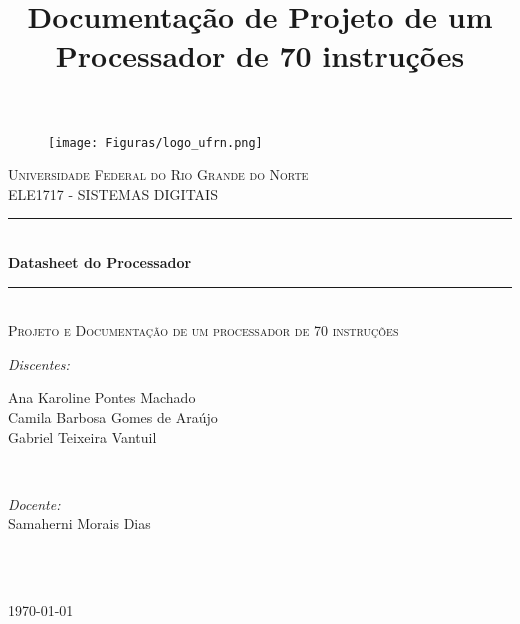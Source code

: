 \documentclass[12pt]{article}
\begin{document}
\title{Documentação de Projeto de um Processador de 70 instruções}

\begin{titlepage}
 
\newcommand{\HRule}{\rule{\linewidth}{0.5mm}} %

\center %

\begin{figure}[!htb]
\centering
\texttt{[image: Figuras/logo\_ufrn.png]}
\end{figure}

\textsc{\LARGE Universidade Federal do Rio Grande do Norte}\\[2cm] %
\textsc{\Large ELE1717 - SISTEMAS DIGITAIS}\\[1cm] %

\HRule \\[0.6cm]
{ \huge \bfseries Datasheet do Processador}\\[0.4cm] %
\HRule \\[1cm]

\textsc{\large Projeto e Documentação de um processador de 70 instruções}\\[3.5cm] %
 

\begin{minipage}{0.4\textwidth}
\begin{flushleft} \large
\emph{Discentes:}\\
\begin{tabbing}
Ana Karoline Pontes Machado\\
Camila Barbosa Gomes de Araújo \\
Gabriel Teixeira Vantuil\\
\end{tabbing}
\end{flushleft}
\end{minipage}
~
\begin{minipage}{0.4\textwidth}
\begin{flushright} \large
\emph{Docente:}\\
Samaherni Morais Dias \\
~
\end{flushright}
\end{minipage}\\[2cm]

\bigskip
\bigskip
\bigskip
\bigskip
\bigskip
\bigskip

{\large \today}\\[2cm] %

\end{titlepage}
\end{document}
